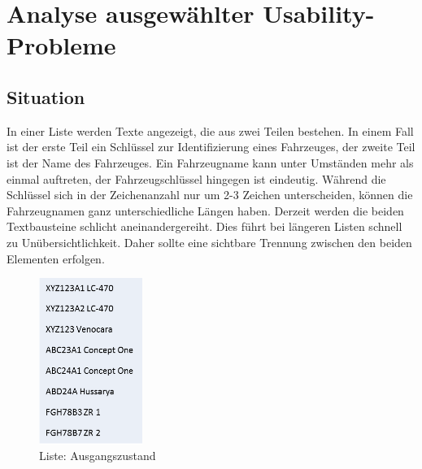 \chapter{Analyse ausgewählter Usability-Probleme}
\section{Situation} \label{sec:analyseSituation}
In einer Liste werden Texte angezeigt, die aus zwei Teilen bestehen. In einem Fall ist der erste Teil ein Schlüssel zur Identifizierung eines Fahrzeuges, der zweite Teil ist der Name des Fahrzeuges. Ein Fahrzeugname kann unter Umständen mehr als einmal auftreten, der Fahrzeugschlüssel hingegen ist eindeutig. Während die Schlüssel sich in der Zeichenanzahl nur um 2-3 Zeichen unterscheiden, können die Fahrzeugnamen ganz unterschiedliche Längen haben. Derzeit werden die beiden Textbausteine schlicht aneinandergereiht. Dies führt bei längeren Listen schnell zu Unübersichtlichkeit. Daher sollte eine sichtbare Trennung zwischen den beiden Elementen erfolgen.

\begin{figure}[H]
 \centering
 \includegraphics[width=0.3\textwidth]{grafiken/Liste_Beispiel.png}
 \caption{Liste: Ausgangszustand}
 \label{fig:liste1}
\end{figure}

